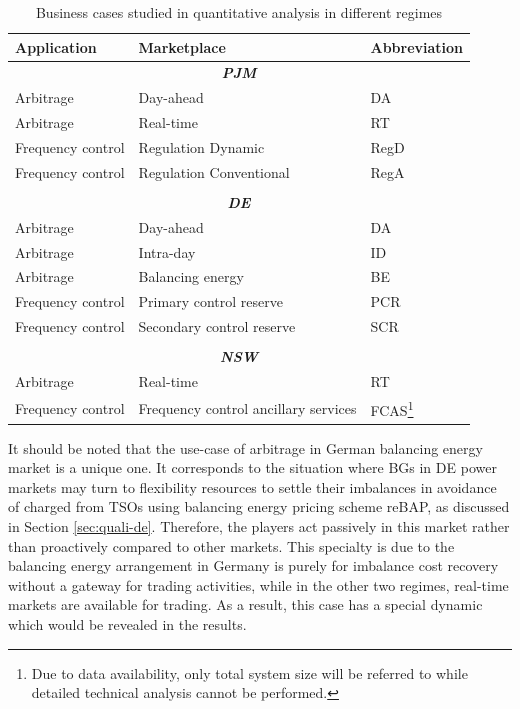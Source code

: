 \begin{table}[h!]
	\small
	\centering
	\begin{tabular}{l l l}
		\hline
		\textbf{Application}  & \textbf{Marketplace} & \textbf{Abbreviation}\\
		\hline
		\multicolumn{3}{c}{\textit{\textbf{PJM}}}\\
		Arbitrage & Day-ahead & DA \\
		Arbitrage & Real-time & RT \\
		Frequency control & Regulation Dynamic & RegD \\
		Frequency control & Regulation Conventional & RegA \\
		&&\\
		\multicolumn{3}{c}{\textit{\textbf{DE}}}\\
		Arbitrage & Day-ahead & DA \\
		Arbitrage & Intra-day & ID \\
		Arbitrage & Balancing energy & BE \\
		Frequency control & Primary control reserve & PCR \\
		Frequency control & Secondary control reserve & SCR \\
		&&\\
		\multicolumn{3}{c}{\textit{\textbf{NSW}}}\\
		Arbitrage & Real-time & RT \\
		Frequency control & Frequency control ancillary services & FCAS\footnote{Due to data availability, only total system size will be referred to while detailed technical analysis cannot be performed.} \\
		\hline
	\end{tabular}
\caption{Business cases studied in quantitative analysis in different regimes}\label{tab:biz-cases}
\end{table}

It should be noted that the use-case of arbitrage in German balancing energy market is a unique one. 
It corresponds to the situation where BGs in DE power markets may turn to flexibility resources to settle their imbalances in avoidance of charged from TSOs using balancing energy pricing scheme reBAP, as discussed in Section \ref{sec:quali-de}. 
Therefore, the players act passively in this market rather than proactively compared to other markets.
This specialty is due to the balancing energy arrangement in Germany is purely for imbalance cost recovery without a gateway for trading activities, while in the other two regimes, real-time markets are available for trading.%
As a result, this case has a special dynamic which would be revealed in the results.

